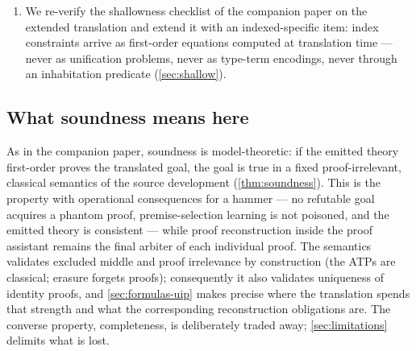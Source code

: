 \begin{enumerate}[leftmargin=2em]
\begin{itemize}
    index premise, \emph{including} equations for statically impossible
    branches; the index-premised variant is strictly weaker and both are
    sound, so the choice is operational
    (\cref{prop:match-equations,prop:premised-weaker}); pruning
    rigidly clashing branches is sound and prunes only semantically dead
    equations (\cref{prop:pruning});
  \item per-occurrence inlining of the forded inversion disjunction ---
    the shallow ``expansion'' of classified occurrences --- is sound in
    both polarities and interderivable with the axiomatic form
    (\cref{thm:expansion,prop:expansion-derivable});
  \item index uniqueness ($\Ihat{I}(w,\tup{z}) \wedge \Ihat{I}(w,\tup{z}')
    \to \tup{z} \feq \tup{z}'$) is a first-order consequence of the
    emitted axioms, while injectivity of the type former itself is
    neither expressible in the signature nor emitted --- as it must not
    be, being anti-classical (\cref{prop:index-unique},
    \cref{rem:hur});
  \item the unconditional singleton collapse is the exact point where the
    model's proof irrelevance is spent as uniqueness of identity proofs;
    Werner's guarded singleton reduction is the premise-carrying
    alternative, and both variants are sound (\cref{fact:uip},
    \cref{prop:guarded-scase}).
  \end{itemize}
\item We re-verify the shallowness checklist of the companion paper on
  the extended translation and extend it with an indexed-specific item:
  index constraints arrive as first-order equations computed at
  translation time --- never as unification problems, never as type-term
  encodings, never through an inhabitation predicate
  (\cref{sec:shallow}).
\end{enumerate}

\subsection{What soundness means here}
\label{sec:intro-soundness}

As in the companion paper, soundness is model-theoretic: if the emitted
theory first-order proves the translated goal, the goal is true in a fixed
proof-irrelevant, classical semantics of the source development
(\cref{thm:soundness}).  This is the property with operational
consequences for a hammer --- no refutable goal acquires a phantom proof,
premise-selection learning is not poisoned, and the emitted theory is
consistent --- while proof reconstruction inside the proof assistant
remains the final arbiter of each individual proof.  The semantics
validates excluded middle and proof irrelevance by construction (the ATPs
are classical; erasure forgets proofs); consequently it also validates
uniqueness of identity proofs, and \cref{sec:formulas-uip} makes precise
where the translation spends that strength and what the corresponding
reconstruction obligations are.  The converse property, completeness, is
deliberately traded away; \cref{sec:limitations} delimits what is lost.

